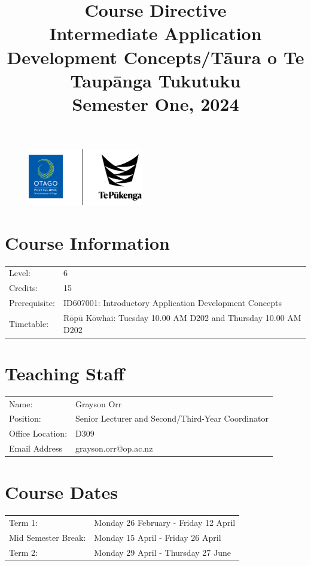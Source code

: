 \documentclass{article}
\author{}
\begin{document}
\begin{figure}
	\centering
	\includegraphics[width=50mm]{../img/logo.png}
\end{figure} 

\title{Course Directive\\Intermediate Application Development Concepts/Tāura o Te Taupānga Tukutuku\\Semester One, 2024}
\date{}
\maketitle

\section*{Course Information}
\begin{tabular}{ll}
	Level:        & 6 \\
	Credits:      & 15                                                             \\
	Prerequisite: & ID607001: Introductory Application Development Concepts                                 \\
	Timetable:    & Rōpū Kōwhai: Tuesday 10.00 AM D202 and Thursday 10.00 AM D202 \\ 
\end{tabular} 

\section*{Teaching Staff}
\begin{tabular}{ll}
	Name:            & Grayson Orr                           \\
	Position:        & Senior Lecturer and Second/Third-Year Coordinator\\
	Office Location: & D309                                 \\
	Email Address    & grayson.orr@op.ac.nz                    
\end{tabular}

\section*{Course Dates}
\begin{tabular}{ll}
	Term 1:           & Monday 26 February - Friday 12 April  \\
	Mid Semester Break: &  Monday 15 April  - Friday 26 April     \\
	Term 2:             & Monday 29 April - Thursday 27 June       \\
\end{tabular}
\end{document}
